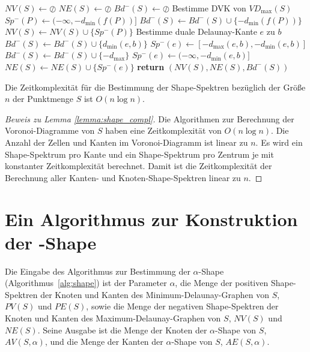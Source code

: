 \begin{algorithm}\caption{Bestimmung der negative Shape-Spektren}\label{alg:negSpec}
\begin{algorithmic}[0]
	\State $NV(S) \gets \oslash$
	\State $NE(S) \gets \oslash$
	\State $Bd^-(S) \gets \oslash$
	\State Bestimme DVK von $VD_{\max}(S)$
		\State $Sp^-(P) \gets (-\infty,-d_{\min}(f(P))]$
		\State $Bd^-(S) \gets Bd^-(S) \cup \lbrace -d_{\min}(f(P)) \rbrace$
		\State $NV(S) \gets NV(S) \cup \lbrace Sp^-(P) \rbrace$
	\EndFor
		\State Bestimme duale Delaunay-Kante $e$ zu $b$
		\State $Bd^-(S) \gets Bd^-(S) \cup \lbrace d_{\min}(e,b) \rbrace$
			\State $Sp^-(e) \gets [-d_{\max}(e,b),-d_{\min}(e,b)]$
			\State $Bd^-(S) \gets Bd^-(S) \cup \lbrace -d_{\max} \rbrace$
		\Else
			\State $Sp^-(e) \gets (-\infty,-d_{\min}(e,b)]$
		\EndIf
		\State $NE(S) \gets NE(S) \cup \lbrace Sp^-(e) \rbrace$
	\EndFor
	\State \textbf{return} $(NV(S),NE(S),Bd^-(S))$
\EndFunction
\end{algorithmic}
\end{algorithm}

\begin{lemma}\label{lemma:shape_compl}
Die Zeitkomplexität für die Bestimmung der Shape-Spektren bezüglich der Größe $n$ der Punktmenge $S$ ist $O(n \log{n})$.
\end{lemma}

\begin{proof}[Beweis zu Lemma \ref{lemma:shape_compl}]
Die Algorithmen zur Berechnung der Voronoi-Diagramme von $S$ haben eine Zeitkomplexität von $O(n \log{n})$. Die Anzahl der Zellen und Kanten im Voronoi-Diagramm ist linear zu $n$. Es wird ein Shape-Spektrum pro Kante und ein Shape-Spektrum pro Zentrum je mit konstanter Zeitkomplexität berechnet. Damit ist die Zeitkomplexität der Berechnung aller Kanten- und Knoten-Shape-Spektren linear zu $n$.
\end{proof}

\section[Ein Algorithmus zur Konstruktion der $\alpha$-Shape]{Ein Algorithmus zur Konstruktion der \boldmath{$\alpha$}-Shape}

Die Eingabe des Algorithmus zur Bestimmung der $\alpha$-Shape (Algorithmus~\ref{alg:shape}) ist der Parameter $\alpha$, die Menge der positiven Shape-Spektren der Knoten und Kanten des Minimum-Delaunay-Graphen von $S$, $PV(S)$ und $PE(S)$, sowie die Menge der negativen Shape-Spektren der Knoten und Kanten des Maximum-Delaunay-Graphen von $S$, $NV(S)$ und $NE(S)$. Seine Ausgabe ist die Menge der Knoten der $\alpha$-Shape von $S$, $AV(S,\alpha)$, und die Menge der Kanten der $\alpha$-Shape von $S$, $AE(S,\alpha)$.


